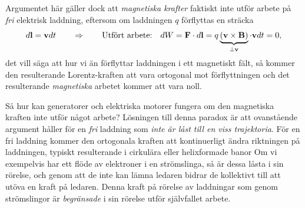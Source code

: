 {{Argumentet h{\"a}r g{\"a}ller dock att {\it magnetiska krafter} faktiskt inte
utf{\"o}r arbete p{\aa} {\it fri} elektrisk laddning, eftersom om laddningen
$q$ f{\"o}rflyttas en str{\"a}cka
\hl{$$
  d{\bf l}={\bf v}dt
  \qquad\Rightarrow\qquad\hbox{Utf{\"o}rt arbete:}\quad
  dW={\bf F}\cdot d{\bf l}
    =q\underbrace{({\bf v}\times{\bf B})}_{\perp{\bf v}}\cdot{\bf v}dt
    =0,
$$}
det vill s{\"a}ga att hur vi {\"a}n f{\"o}rflyttar laddningen i ett magnetiskt
f{\"a}lt, s{\aa} kommer den resulterande Lorentz-kraften att vara ortogonal mot
f{\"o}rflyttningen och det resulterande {\it magnetiska} arbetet kommer att
vara noll.

S{\aa} hur kan generatorer och elektriska motorer fungera om den magnetiska
kraften inte utf{\"o}r n{\aa}got arbete? L{\"o}sningen till denna paradox
{\"a}r att ovanst{\aa}ende argument h{\aa}ller f{\"o}r en {\it fri} laddning
som {\it inte {\"a}r l{\aa}st till en viss trajektoria}.
F{\"o}r en fri laddning kommer den ortogonala kraften att kontinuerligt
{\"a}ndra riktningen p{\aa} laddningen, typiskt resulterande i cirkul{\"a}ra
eller helixformade banor
Om vi exempelvis har ett fl{\"o}de av elektroner i en str{\"o}mslinga, s{\aa}
{\"a}r dessa l{\aa}sta i sin r{\"o}relse, och genom att de inte kan l{\"a}mna
ledaren bidrar de kollektivt till att ut{\"o}va en kraft p{\aa} ledaren.
Denna kraft p{\aa} r{\"o}relse av laddningar som genom str{\"o}mslingor {\"a}r
{\it begr{\"a}nsade} i sin r{\"o}relse utf{\"o}r sj{\"a}lvfallet arbete.

}}
